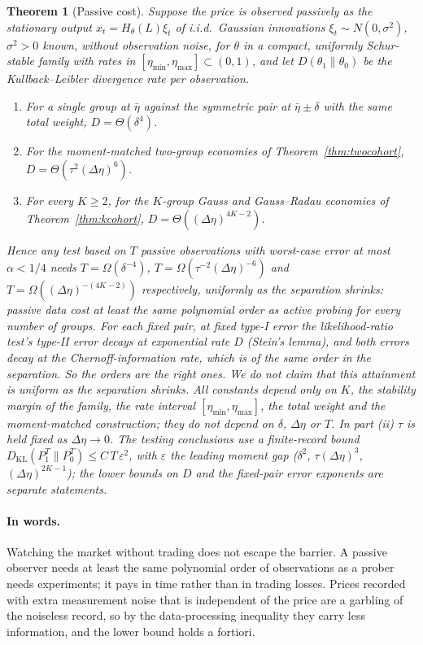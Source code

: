\documentclass[12pt]{article}
\newtheorem{theorem}{Theorem}[section]
\theoremstyle{definition}
\theoremstyle{remark}
\newcommand{\KL}{D_{\mathrm{KL}}}
\begin{document}
\begin{theorem}[Passive cost]\label{prop:passive}
Suppose the price is observed passively as the stationary output $x_t=H_\theta(L)\xi_t$ of i.i.d.\ Gaussian innovations $\xi_t\sim N(0,\sigma^2)$, $\sigma^2>0$ known, without observation noise, for $\theta$ in a compact, uniformly Schur-stable family with rates in $[\eta_{\min},\eta_{\max}]\subset(0,1)$, and let $D(\theta_1\|\theta_0)$ be the Kullback--Leibler divergence rate per observation.
\begin{enumerate}[label=(\roman*)]
\item For a single group at $\bar\eta$ against the symmetric pair at $\bar\eta\pm\delta$ with the same total weight, $D=\Theta(\delta^4)$.
\item For the moment-matched two-group economies of Theorem~\ref{thm:twocohort}, $D=\Theta(\tau^2(\Delta\eta)^6)$.
\item For every $K\ge2$, for the $K$-group Gauss and Gauss--Radau economies of Theorem~\ref{thm:kcohort}, $D=\Theta((\Delta\eta)^{4K-2})$.
\end{enumerate}
Hence any test based on $T$ passive observations with worst-case error at most $\alpha<1/4$ needs $T=\Omega(\delta^{-4})$, $T=\Omega(\tau^{-2}(\Delta\eta)^{-6})$ and $T=\Omega((\Delta\eta)^{-(4K-2)})$ respectively, uniformly as the separation shrinks: passive data cost at least the same polynomial order as active probing for every number of groups. For each fixed pair, at fixed type-I error the likelihood-ratio test's type-II error decays at exponential rate $D$ (Stein's lemma), and both errors decay at the Chernoff-information rate, which is of the same order in the separation. So the orders are the right ones. We do not claim that this attainment is uniform as the separation shrinks. All constants depend only on $K$, the stability margin of the family, the rate interval $[\eta_{\min},\eta_{\max}]$, the total weight and the moment-matched construction; they do not depend on $\delta$, $\Delta\eta$ or $T$. In part (ii) $\tau$ is held fixed as $\Delta\eta\to0$. The testing conclusions use a finite-record bound $\KL(P_1^T\|P_0^T)\le C\,T\,\varepsilon^2$, with $\varepsilon$ the leading moment gap ($\delta^2$, $\tau(\Delta\eta)^3$, $(\Delta\eta)^{2K-1}$); the lower bounds on $D$ and the fixed-pair error exponents are separate statements.
\end{theorem}


\paragraph{In words.} Watching the market without trading does not escape the barrier. A passive observer needs at least the same polynomial order of observations as a prober needs experiments; it pays in time rather than in trading losses. Prices recorded with extra measurement noise that is independent of the price are a garbling of the noiseless record, so by the data-processing inequality they carry less information, and the lower bound holds a fortiori.
\end{document}

